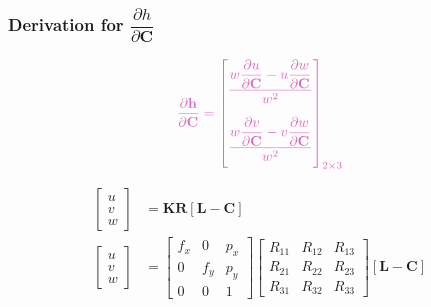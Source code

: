 \documentclass{article}
\renewcommand{\Vec}[1]{{\mathbf{#1}}}
\newcommand{\Mat}[1]{{\mathbf{#1}}}
\newcommand{\camRot}{{\Vec{R}}}
\newcommand{\camPos}{{\Vec{C}}}
\newcommand{\landmarkPos}{{\Vec{L}}}
\newcommand{\projFunc}{{\Vec{h}}}
\begin{document}
\subsubsection*{Derivation for \color{Thistle}
$\dfrac{\partial{h}}{\partial{\camPos}}$}

\begin{align}
  \color{Thistle}
  \dfrac{\partial{\projFunc}}{\partial{\camPos}} =
  \begin{bmatrix}
    \dfrac{
      w \dfrac{\partial{u}}{\partial{\camPos}} -
      u \dfrac{\partial{w}}{\partial{\camPos}}
    }{w^{2}} \vspace{1.0em} \\
    \dfrac{
      w \dfrac{\partial{v}}{\partial{\camPos}} -
      v \dfrac{\partial{w}}{\partial{\camPos}}
    }{w^{2}} \vspace{0.5em}
  \end{bmatrix}_{2 \times 3}
\end{align}

\begin{align}
  \begin{bmatrix} u \\ v \\ w \end{bmatrix}
    &= \Mat{K} \camRot [\landmarkPos - \camPos] 
    \nonumber \\
  \begin{bmatrix} u \\ v \\ w \end{bmatrix}
  &= \begin{bmatrix}
      f_x & 0 & p_x \\
      0 & f_y & p_y \\
      0 & 0 & 1
  \end{bmatrix}
  \begin{bmatrix}
      R_{11} & R_{12} & R_{13} \\
      R_{21} & R_{22} & R_{23} \\
      R_{31} & R_{32} & R_{33}
  \end{bmatrix}
  [\landmarkPos - \camPos] 
  \nonumber
\end{align}
\end{document}
